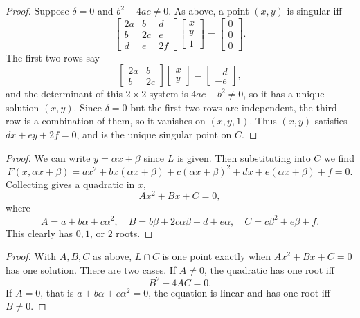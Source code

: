 \begin{proof}
    Suppose $\delta = 0$ and $b^2 - 4ac \ne 0$. As above, a point $(x, y)$ is singular iff
    \[
    \begin{bmatrix}
        2a & b & d \\
        b & 2c & e \\
        d & e & 2f
    \end{bmatrix}
    \begin{bmatrix}
        x \\ y \\ 1
    \end{bmatrix}
    =
    \begin{bmatrix}
        0 \\ 0 \\ 0
    \end{bmatrix}.
    \]
    The first two rows say
    \[
    \begin{bmatrix}
        2a & b \\
        b & 2c
    \end{bmatrix}
    \begin{bmatrix}
        x \\ y
    \end{bmatrix}
    =
    \begin{bmatrix}
        -d \\ -e
    \end{bmatrix},
    \]
    and the determinant of this $2 \times 2$ system is $4ac - b^2 \ne 0$, so it has a unique solution $(x, y)$.
    Since $\delta = 0$ but the first two rows are independent, the third row is a combination of them,
    so it vanishes on $(x, y, 1)$. Thus $(x, y)$ satisfies $dx + ey + 2f = 0$, and is the
    unique singular point on $C$.
\end{proof}

\begin{proof}
    We can write $y = \alpha x + \beta$ since $L$ is given. Then substituting into $C$ we find 
    \[F(x, \alpha x + \beta) 
    = a x^2 
    + b x\left(\alpha x + \beta\right)
    + c\left(\alpha x + \beta\right)^2 
    + d x 
    + e\left(\alpha x + \beta\right)
    + f = 0.\]
    Collecting gives a quadratic in $x$,
    \[
    A x^2 + B x + C = 0,
    \]
    where
    \[A = a + b\alpha + c\alpha^2, \quad B = b\beta + 2c\alpha\beta + d + e\alpha, \quad C = c\beta^2 + e\beta + f.\]
    This clearly has $0, 1$, or $2$ roots.
\end{proof}

\begin{proof}
    With $A, B, C$ as above, $L \cap C$ is one point exactly when $A x^2 + B x + C = 0$ has one solution.
    There are two cases. If $A \ne 0$, the quadratic has one root iff
    \[B^2 - 4AC = 0.\]
    If $A = 0$, that is $a + b\alpha + c\alpha^2 = 0$, the equation is
    linear and has one root iff $B \ne 0$.
\end{proof}

